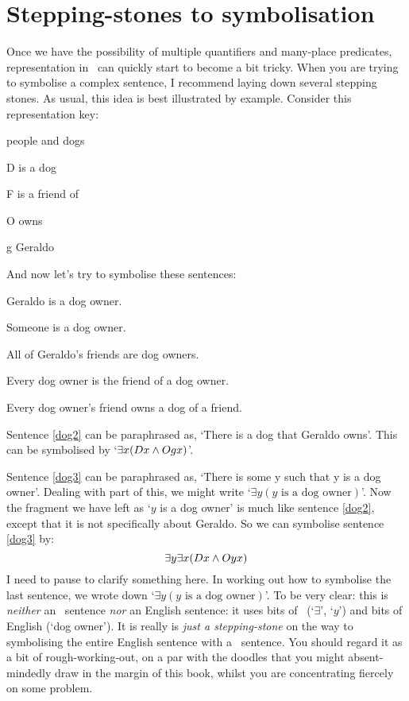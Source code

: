 \section{Stepping-stones to symbolisation}
Once we have the possibility of multiple quantifiers and many-place predicates, representation in \FOL\ can quickly start to become a bit tricky. When you are trying to symbolise a complex sentence, I recommend laying down several stepping stones. As usual, this idea is best illustrated by example. Consider this representation key:
\begin{ekey}
\item[\text{domain}] people and dogs
\item[D]  is a dog
\item[F]  is a friend of 
\item[O]  owns 
\item[g] Geraldo
\end{ekey}
And now let's try to symbolise these sentences:
\begin{earg}
\item[\ex{dog2}] Geraldo is a dog owner.
\item[\ex{dog3}] Someone is a dog owner.
\item[\ex{dog4}] All of Geraldo's friends are dog owners.
\item[\ex{dog5}] Every dog owner is the friend of a dog owner.
\item[\ex{dog6}] Every dog owner's friend owns a dog of a friend.
\end{earg}
Sentence \ref{dog2} can be paraphrased as, `There is a dog that Geraldo owns'. This can be symbolised by `$\exists x(Dx \wedge Ogx)$'.

Sentence \ref{dog3} can be paraphrased as, `There is some y such that y is a dog owner'. Dealing with part of this, we might write `$\exists y(y\text{ is a dog owner})$'. Now the fragment we have left as `$y$ is a dog owner' is much like sentence \ref{dog2}, except that it is not specifically about Geraldo. So we can symbolise sentence \ref{dog3} by:
$$\exists y \exists x(Dx \wedge Oyx)$$
I need to pause to clarify something here. In working out how to symbolise the last sentence, we wrote down `$\exists y(y\text{ is a dog owner})$'. To be very clear: this is \emph{neither} an \FOL\ sentence \emph{nor} an English sentence: it uses bits of \FOL\ (`$\exists$', `$y$') and bits of English (`dog owner'). It is really is \emph{just a stepping-stone} on the way to symbolising the entire English sentence with a \FOL\ sentence. You should regard it as a bit of rough-working-out, on a par with the doodles that you might absent-mindedly draw in the margin of this book, whilst you are concentrating fiercely on some problem.  

